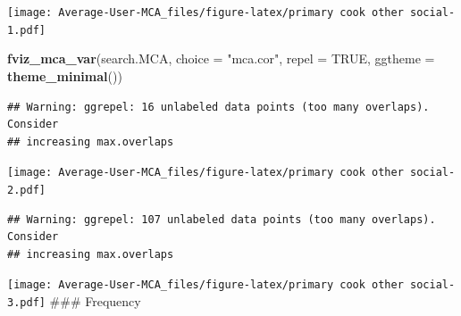 \documentclass[
]{article}
\newenvironment{Shaded}{\begin{snugshade}}{\end{snugshade}}
\newcommand{\DataTypeTok}[1]{\textcolor[rgb]{0.13,0.29,0.53}{#1}}
\newcommand{\KeywordTok}[1]{\textcolor[rgb]{0.13,0.29,0.53}{\textbf{#1}}}
\newcommand{\NormalTok}[1]{#1}
\newcommand{\OtherTok}[1]{\textcolor[rgb]{0.56,0.35,0.01}{#1}}
\newcommand{\StringTok}[1]{\textcolor[rgb]{0.31,0.60,0.02}{#1}}
\begin{document}
\texttt{[image: Average-User-MCA\_files/figure-latex/primary cook other social-1.pdf]}

\begin{Shaded}
\begin{Highlighting}[]
\KeywordTok{fviz_mca_var}\NormalTok{(search.MCA, }\DataTypeTok{choice =} \StringTok{"mca.cor"}\NormalTok{, }\DataTypeTok{repel =} \OtherTok{TRUE}\NormalTok{,}
             \DataTypeTok{ggtheme =} \KeywordTok{theme_minimal}\NormalTok{())}
\end{Highlighting}
\end{Shaded}

\begin{verbatim}
## Warning: ggrepel: 16 unlabeled data points (too many overlaps). Consider
## increasing max.overlaps
\end{verbatim}

\texttt{[image: Average-User-MCA\_files/figure-latex/primary cook other social-2.pdf]}

\begin{Shaded}
\end{Shaded}

\begin{verbatim}
## Warning: ggrepel: 107 unlabeled data points (too many overlaps). Consider
## increasing max.overlaps
\end{verbatim}

\texttt{[image: Average-User-MCA\_files/figure-latex/primary cook other social-3.pdf]}
\#\#\# Frequency
\end{document}
